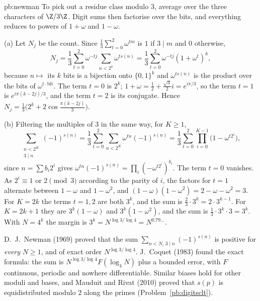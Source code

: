 \begin{solution}{pb:newman}
\idea To pick out a residue class modulo $3$, average over the three characters of $\Z/3\Z$. Digit sums then factorise over the
bits, and everything reduces to powers of $1+\omega$ and $1-\omega$.

\writeup (a) Let $N_j$ be the count. Since $\frac13\sum_{t=0}^2\omega^{tm}$ is $1$ if $3\mid m$ and $0$ otherwise,
\[
N_j=\frac13\sum_{t=0}^2\omega^{-tj}\sum_{n<2^k}\omega^{ts(n)}=\frac13\sum_{t=0}^2\omega^{-tj}(1+\omega^t)^k,
\]
because $n\mapsto$ its $k$ bits is a bijection onto $\{0,1\}^k$ and $\omega^{ts(n)}$ is the product over the bits of $\omega^{t\cdot\text{bit}}$. The term $t=0$ is
$2^k$; $1+\omega=\frac12+\frac{\sqrt3}2i=e^{i\pi/3}$, so the term $t=1$ is $e^{i\pi(k-2j)/3}$, and the term $t=2$ is its conjugate. Hence
$N_j=\frac13\bigl(2^k+2\cos\frac{\pi(k-2j)}3\bigr)$.

(b) Filtering the multiples of $3$ in the same way, for $K\ge1$,
\[
\sum_{\substack{n<2^K\\3\mid n}}(-1)^{s(n)}=\frac13\sum_{t=0}^2\sum_{n<2^K}\omega^{tn}(-1)^{s(n)}=\frac13\sum_{t=0}^2\prod_{i=0}^{K-1}\bigl(1-\omega^{t2^i}\bigr),
\]
since $n=\sum b_i2^i$ gives $\omega^{tn}(-1)^{s(n)}=\prod_i(-\omega^{t2^i})^{b_i}$. The term $t=0$ vanishes. As $2^i\equiv1$ or $2\pmod3$ according to the parity of $i$,
the factors for $t=1$ alternate between $1-\omega$ and $1-\omega^2$, and $(1-\omega)(1-\omega^2)=2-\omega-\omega^2=3$. For $K=2k$ the terms $t=1,2$ are
both $3^k$, and the sum is $\frac23\cdot3^k=2\cdot3^{k-1}$. For $K=2k+1$ they are $3^k(1-\omega)$ and $3^k(1-\omega^2)$, and the sum is $\frac13\cdot3^k\cdot3=3^k$.
With $N=4^k$ the margin is $3^k=N^{\log3/\log4}=N^{0.79\ldots}$.

\leads D.~J.~Newman (1969) proved that the sum $\sum_{n<N,\,3\mid n}(-1)^{s(n)}$ is positive for \emph{every} $N\ge1$, and of exact order
$N^{\log3/\log4}$. J.~Coquet (1983) found the exact formula: the sum is $N^{\log3/\log4}F(\log_4N)$ plus a bounded error, with $F$ continuous,
periodic and nowhere differentiable. Similar biases hold for other moduli and bases, and Mauduit and Rivat (2010) proved that
$s(p)$ is equidistributed modulo $2$ along the primes (Problem~\ref{pb:digitsclt}).
\end{solution}

